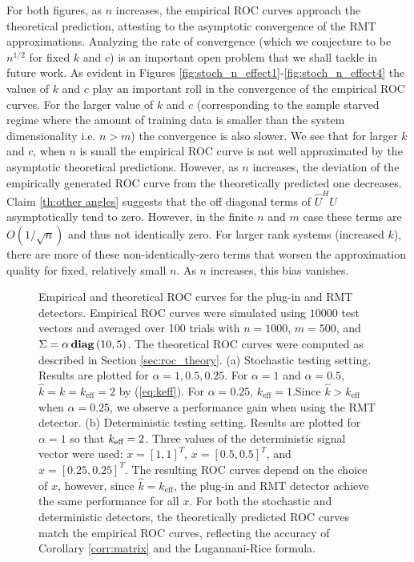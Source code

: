 For both figures, as $n$ increases, the empirical ROC curves approach the theoretical prediction, attesting to the asymptotic convergence of the RMT approximations. Analyzing the rate of convergence (which we conjecture to be $n^{1/2}$ for fixed $k$ and $c$) is an important open problem that we shall tackle in future work. As evident in Figures \ref{fig:stoch_n_effect1}-\ref{fig:stoch_n_effect4} the values of $k$ and $c$ play an important roll in the convergence of the empirical ROC curves. For the larger value of $k$ and $c$ (corresponding to the sample starved regime where the amount of training data is smaller than the system dimensionality i.e. $n>m$) the convergence is also slower. We see that for larger $k$ and $c$, when $n$ is small the empirical ROC curve is not well approximated by the asymptotic theoretical predictions. However, as $n$ increases, the deviation of the empirically generated ROC curve from the theoretically predicted one decreases. Claim \ref{th:other angles} suggests that the off diagonal terms of $\widehat{U}^HU$ asymptotically tend to zero. However, in the finite $n$ and $m$ case these terms are $O(1/\sqrt{n})$ and thus not identically zero. For larger rank systems (increased $k$), there are more of these non-identically-zero terms that worsen the approximation quality for fixed, relatively small $n$. As $n$ increases, this bias vanishes.

\begin{figure}
\centering
{}
\vspace{-0.1in}
\caption{Empirical and theoretical ROC curves for the plug-in and RMT detectors. Empirical ROC curves were simulated using $10000$ test vectors and averaged over 100 trials with $n=1000$, $m=500$, and $\Sigma =\alpha\mathop{\bf diag}\left(10,5\right)$. The theoretical ROC curves were computed as described in Section \ref{sec:roc_theory}. (a) Stochastic testing setting. Results are plotted for $\alpha=1,0.5,0.25$. For $\alpha=1$ and $\alpha=0.5$, $\widehat{k}=k=k_\text{eff}=2$ by (\ref{eq:keff}). For $\alpha=0.25$, $k_\text{eff}=1$.Since $\widehat{k} > k_{\text{eff}}$ when $\alpha=0.25$, we observe a performance gain when using the RMT detector. (b) Deterministic testing setting. Results are plotted for $\alpha=1$ so that $k_\text{eff}=2$. Three values of the deterministic signal vector were used: $x=[1,1]^T$, $x=[0.5,0.5]^T$, and $x=[0.25,0.25]^T$. The resulting ROC curves depend on the choice of $x$, however, since $\widehat{k} = k_{\text{eff}}$, the plug-in and RMT detector achieve the same performance for all $x$. For both the stochastic and deterministic detectors, the theoretically predicted ROC curves match the empirical ROC curves, reflecting the accuracy of Corollary \ref{corr:matrix} and the Lugannani-Rice formula.}
\vspace{-0.3in}
\end{figure}

